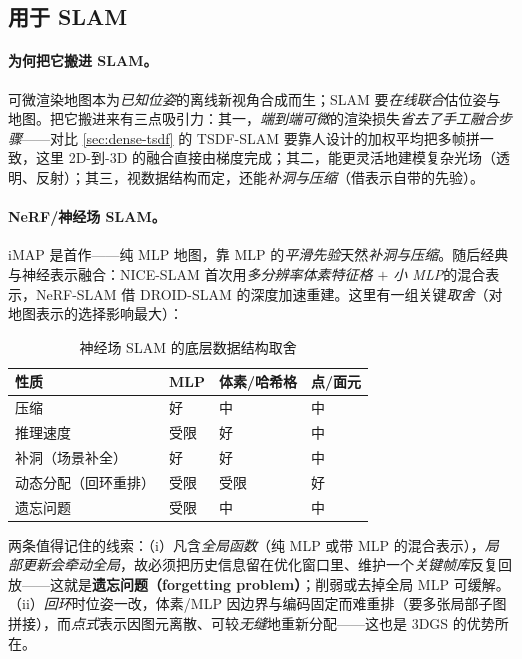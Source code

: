 \subsection{用于 SLAM}
\label{sec:dense-radiance-slam}

\paragraph{为何把它搬进 SLAM。}
可微渲染地图本为\emph{已知位姿}的离线新视角合成而生；SLAM 要\emph{在线联合}估位姿与地图。把它搬进来有三点吸引力\cite{matsuki2024monogs}：其一，\emph{端到端可微}的渲染损失\emph{省去了手工融合步骤}——对比 \cref{sec:dense-tsdf} 的 TSDF-SLAM 要靠人设计的加权平均把多帧拼一致，这里 2D-到-3D 的融合直接由梯度完成；其二，能更灵活地建模复杂光场（透明、反射）；其三，视数据结构而定，还能\emph{补洞与压缩}（借表示自带的先验）。

\paragraph{NeRF/神经场 SLAM。}
iMAP\cite{sucar2021imap} 是首作——纯 MLP 地图，靠 MLP 的\emph{平滑先验}天然\emph{补洞与压缩}。随后经典与神经表示融合：NICE-SLAM\cite{zhu2022niceslam} 首次用\emph{多分辨率体素特征格 $+$ 小 MLP}的混合表示，NeRF-SLAM\cite{rosinol2023nerfslam} 借 DROID-SLAM 的深度加速重建。这里有一组关键\emph{取舍}（对地图表示的选择影响最大）：

\begin{table}[H]\centering\small
\caption{神经场 SLAM 的底层数据结构取舍\cite{sucar2021imap,zhu2022niceslam}}
\label{tab:dense-neuralfield}
\begin{tabular}{p{} p{} p{} p{}}
\toprule
性质 & MLP & 体素/哈希格 & 点/面元 \\
\midrule
压缩 & 好 & 中 & 中 \\
推理速度 & 受限 & 好 & 中 \\
补洞（场景补全） & 好 & 好 & 中 \\
动态分配（回环重排） & 受限 & 受限 & 好 \\
遗忘问题 & 受限 & 中 & 中 \\
\bottomrule
\end{tabular}
\end{table}

\noindent{}两条值得记住的线索：（i）凡含\emph{全局函数}（纯 MLP 或带 MLP 的混合表示），\emph{局部更新会牵动全局}，故必须把历史信息留在优化窗口里、维护一个\emph{关键帧库}反复回放——这就是\textbf{遗忘问题（forgetting problem）}；削弱或去掉全局 MLP 可缓解。（ii）\emph{回环}时位姿一改，体素/MLP 因边界与编码固定而难重排（要多张局部子图拼接），而\emph{点式}表示因图元离散、可较\emph{无缝}地重新分配——这也是 3DGS 的优势所在。


